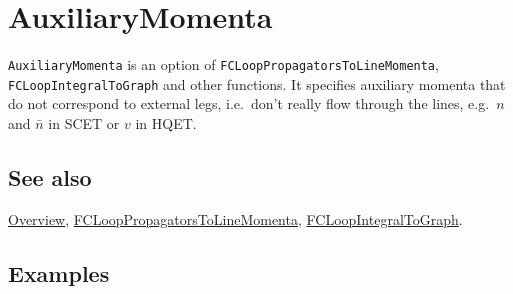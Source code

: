 \documentclass[../FeynCalcManual.tex]{subfiles}
\begin{document}
\hypertarget{auxiliarymomenta}{%
\section{AuxiliaryMomenta}\label{auxiliarymomenta}}

\texttt{AuxiliaryMomenta} is an option of
\texttt{FCLoopPropagatorsToLineMomenta}, \texttt{FCLoopIntegralToGraph}
and other functions. It specifies auxiliary momenta that do not
correspond to external legs, i.e.~don't really flow through the lines,
e.g.~\(n\) and \(\bar{n}\) in SCET or \(v\) in HQET.

\subsection{See also}

\hyperlink{toc}{Overview},
\hyperlink{fclooppropagatorstolinemomenta}{FCLoopPropagatorsToLineMomenta},
\hyperlink{fcloopintegraltograph}{FCLoopIntegralToGraph}.

\subsection{Examples}
\end{document}

